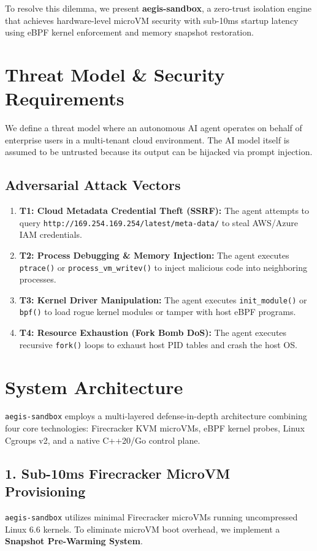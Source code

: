 \documentclass[11pt,a4paper]{article}
\begin{document}
To resolve this dilemma, we present \textbf{aegis-sandbox}, a zero-trust isolation engine that achieves hardware-level microVM security with sub-10ms startup latency using eBPF kernel enforcement and memory snapshot restoration.

\section{Threat Model \& Security Requirements}
We define a threat model where an autonomous AI agent operates on behalf of enterprise users in a multi-tenant cloud environment. The AI model itself is assumed to be untrusted because its output can be hijacked via prompt injection.

\subsection{Adversarial Attack Vectors}
\begin{enumerate}
    \item \textbf{T1: Cloud Metadata Credential Theft (SSRF):} The agent attempts to query \texttt{http://169.254.169.254/latest/meta-data/} to steal AWS/Azure IAM credentials.
    \item \textbf{T2: Process Debugging \& Memory Injection:} The agent executes \texttt{ptrace()} or \texttt{process\_vm\_writev()} to inject malicious code into neighboring processes.
    \item \textbf{T3: Kernel Driver Manipulation:} The agent executes \texttt{init\_module()} or \texttt{bpf()} to load rogue kernel modules or tamper with host eBPF programs.
    \item \textbf{T4: Resource Exhaustion (Fork Bomb DoS):} The agent executes recursive \texttt{fork()} loops to exhaust host PID tables and crash the host OS.
\end{enumerate}

\section{System Architecture}
\texttt{aegis-sandbox} employs a multi-layered defense-in-depth architecture combining four core technologies: Firecracker KVM microVMs, eBPF kernel probes, Linux Cgroups v2, and a native C++20/Go control plane.

\subsection{1. Sub-10ms Firecracker MicroVM Provisioning}
\texttt{aegis-sandbox} utilizes minimal Firecracker microVMs running uncompressed Linux 6.6 kernels. To eliminate microVM boot overhead, we implement a \textbf{Snapshot Pre-Warming System}. 
\end{document}
